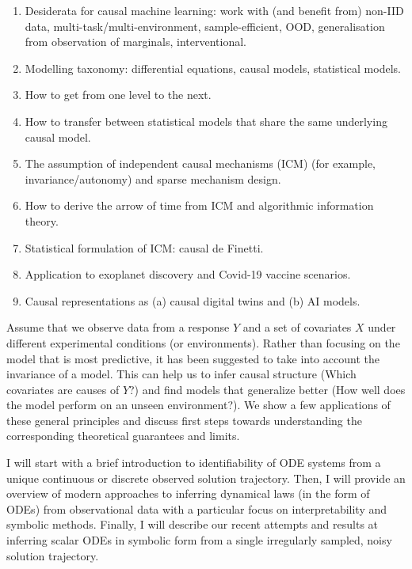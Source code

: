 \begin{enumerate}
\item Desiderata for causal machine learning: work with (and benefit from) non-IID data, multi-task/multi-environment, sample-efficient, OOD, generalisation from observation of marginals, interventional.
 \item Modelling taxonomy: differential equations, causal models, statistical models.
 \item How to get from one level to the next.
\item How to transfer between statistical models that share the same underlying causal model. 
\item The assumption of independent causal mechanisms (ICM) (for example, invariance/autonomy) and sparse mechanism design. 
 \item How to derive the arrow of time from ICM and algorithmic information theory.
 \item Statistical formulation of ICM: causal de Finetti.
 \item Application to exoplanet discovery and Covid-19 vaccine scenarios.
 \item Causal representations as (a) causal digital twins and (b) AI models.
\end{enumerate}

\license

Assume that we observe data from a response $Y$ and a set of covariates $X$ under different experimental conditions (or environments). Rather than focusing on the model that is most predictive, it has been suggested to take into account the invariance of a model. This can help us to infer causal structure (Which covariates are causes of $Y$?) and find models that generalize better (How well does the model perform on an unseen environment?). We show a few applications of these general principles and discuss first steps towards understanding the corresponding theoretical guarantees and limits.

\license

I will start with a brief introduction to identifiability of ODE systems from a unique continuous or discrete observed solution trajectory. Then, I will provide an overview of modern approaches to inferring dynamical laws (in the form of ODEs) from observational data with a particular focus on interpretability and symbolic methods. Finally, I will describe our recent attempts and results at inferring scalar ODEs in symbolic form from a single irregularly sampled, noisy solution trajectory.

